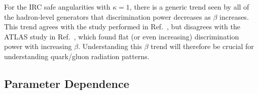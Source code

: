 \documentclass[11pt]{cernrep}
\begin{document}
For the IRC safe angularities with $\kappa = 1$, there is a generic trend seen by all of the hadron-level generators that discrimination power decreases as $\beta$ increases.  This trend agrees with the study performed in Ref.~\cite{Larkoski:2013eya}, but disagrees with the ATLAS study in Ref.~\cite{Aad:2014gea}, which found flat (or even increasing) discrimination power with increasing $\beta$.  Understanding this $\beta$ trend will therefore be crucial for understanding quark/gluon radiation patterns.

\subsection{Parameter Dependence}
\label{quarkgluon_sec:ee_scales}

\begin{figure}
\centering
{}
$\qquad$


\end{figure}
\end{document}
